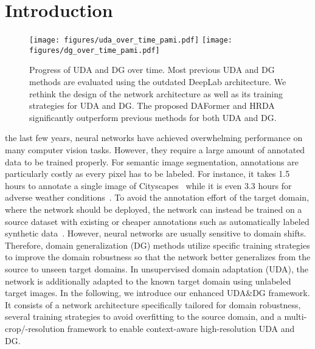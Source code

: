 \documentclass[journal,compsoc]{IEEEtran}
\begin{document}
\maketitle

\section{Introduction}
\label{sec:introduction}

\begin{figure}
    \centering
    \texttt{[image: figures/uda\_over\_time\_pami.pdf]}
    \texttt{[image: figures/dg\_over\_time\_pami.pdf]}
    \caption{Progress of UDA and DG over time. Most previous UDA and DG methods are evaluated using the outdated DeepLab architecture. We rethink the design of the network architecture as well as its training strategies for UDA and DG. The proposed DAFormer and HRDA significantly outperform previous methods for both UDA and DG.}
    \label{fig:uda_over_time}
\end{figure}

 the last few years, neural networks have achieved overwhelming performance on many computer vision tasks. However, they require a large amount of annotated data to be trained properly. For semantic image segmentation, annotations are particularly costly as every pixel has to be labeled. For instance, it takes 1.5 hours to annotate a single image of Cityscapes~\cite{cordts2016cityscapes} while it is even 3.3 hours for adverse weather conditions~\cite{sarkadis2021acdc}.
To avoid the annotation effort of the target domain, where the network should be deployed, the network can instead be trained on a source dataset with existing or cheaper annotations such as automatically labeled synthetic data~\cite{ros2016synthia, richter2016playing}. However, neural networks are usually sensitive to domain shifts. Therefore, domain generalization (DG) methods utilize specific training strategies to improve the domain robustness so that the network better generalizes from the source to unseen target domains. In unsupervised domain adaptation (UDA), the network is additionally adapted to the known target domain using unlabeled target images.
In the following, we introduce our enhanced UDA\&DG framework. It consists of a network architecture specifically tailored for domain robustness, several training strategies to avoid overfitting to the source domain, and a multi-crop/-resolution framework to enable context-aware high-resolution UDA and DG.
\end{document}
